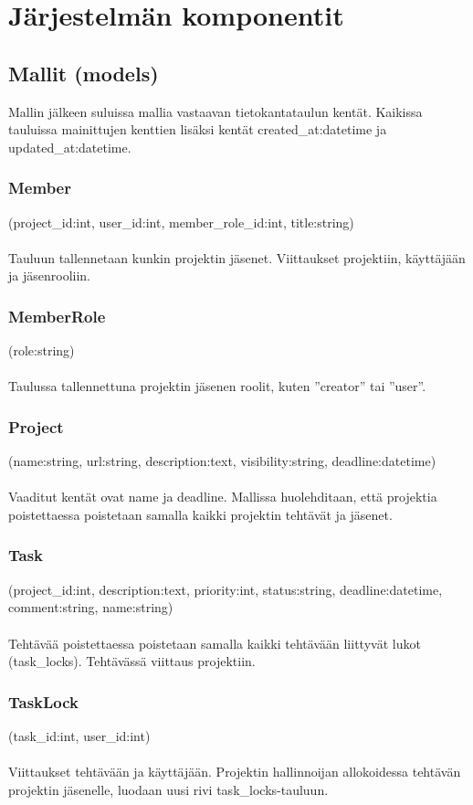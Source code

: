 \documentclass[12pt,a4paper]{article}
\begin{document}
\section*{Järjestelmän komponentit}
\subsection*{Mallit (models)}
Mallin jälkeen suluissa mallia vastaavan tietokantataulun kentät.
Kaikissa tauluissa mainittujen kenttien lisäksi kentät created\_at:datetime ja
updated\_at:datetime.
\subsubsection*{Member}
(project\_id:int, user\_id:int, member\_role\_id:int, title:string)\\\\
Tauluun tallennetaan kunkin projektin jäsenet. Viittaukset projektiin, käyttäjään ja jäsenrooliin.
\subsubsection*{MemberRole}
(role:string)\\\\
Taulussa tallennettuna projektin jäsenen roolit, kuten ”creator” tai ”user”.
\subsubsection*{Project}
(name:string, url:string, description:text, visibility:string, deadline:datetime)\\\\
Vaaditut kentät ovat name ja deadline.
Mallissa huolehditaan, että projektia poistettaessa poistetaan samalla kaikki projektin
tehtävät ja jäsenet.
\subsubsection*{Task}
(project\_id:int, description:text, priority:int, status:string, deadline:datetime,
comment:string, name:string)\\\\
Tehtävää poistettaessa poistetaan samalla kaikki tehtävään liittyvät lukot (task\_locks).
Tehtävässä viittaus projektiin.
\subsubsection*{TaskLock}
(task\_id:int, user\_id:int)\\\\
Viittaukset tehtävään ja käyttäjään.
Projektin hallinnoijan allokoidessa tehtävän projektin jäsenelle, luodaan uusi rivi
task\_locks-tauluun.
\end{document}
